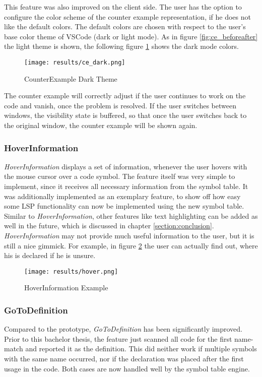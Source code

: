 This feature was also improved on the client side.
The user has the option to configure the color scheme of the counter example representation, if he does not like the default colors.
The default colors are chosen with respect to the user's base color theme of VSCode (dark or light mode).
As in figure \ref{fig:ce_beforeafter} the light theme is shown,
the following figure \ref{fig:ce_dark} shows the dark mode colors.

\begin{figure}[H]
    \centering
    \texttt{[image: results/ce\_dark.png]}
    \caption{CounterExample Dark Theme}
    \label{fig:ce_dark}
\end{figure}

The counter example will correctly adjust if the user continues to work on the code and vanish, once the problem is resolved.
If the user switches between windows, the visibility state is buffered, so that once the user switches back to the original window, the counter example will be shown again.

\subsubsection{HoverInformation}
\textit{HoverInformation} displays a set of information, whenever the user hovers with the mouse cursor over a code symbol.
The feature itself was very simple to implement, since it receives all necessary information from the symbol table.
It was additionally implemented as an exemplary feature, to show off how easy some LSP functionality can now be implemented using the new symbol table.
Similar to \textit{HoverInformation}, other features like text highlighting can be added as well in the future, which is discussed in chapter \ref{section:conclusion}.
\textit{HoverInformation} may not provide much useful information to the user, but it is still a nice gimmick.
For example, in figure \ref{fig:hover} the user can actually find out, where his  is declared if he is unsure.
\begin{figure}[H]
    \centering
    \texttt{[image: results/hover.png]}
    \caption{HoverInformation Example}
    \label{fig:hover}
\end{figure}

\subsubsection{GoToDefinition}
Compared to the prototype, \textit{GoToDefinition} has been significantly improved.
Prior to this bachelor thesis, the feature just scanned all code for the first name-match and reported it as the definition.
This did neither work if multiple symbols with the same name occurred, nor if the declaration was placed after the first usage in the code.
Both cases are now handled well by the symbol table engine.\\

